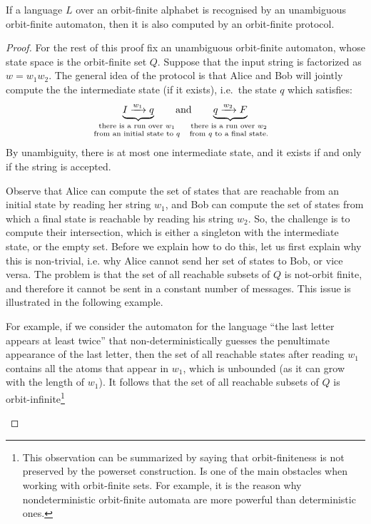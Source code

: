 \begin{theorem}
    \label{thm:unambiguous-to-protocol}
    If a language $L$ over an orbit-finite alphabet is recognised by an unambiguous orbit-finite automaton, then it is also computed by an orbit-finite protocol.
\end{theorem}
\begin{proof}
For the rest of this proof fix an unambiguous orbit-finite automaton, whose state space is the orbit-finite set $Q$.
Suppose that the input string is factorized as $w = w_1 w_2$. The general idea of the protocol is that Alice and Bob will jointly
compute the the intermediate state (if it exists), i.e.~the state $q$ which satisfies:
\begin{align*}
\myunderbrace{I \xrightarrow{w_1}q}{there is a run over $w_1$\\ from an initial state to $q$} \qquad \text{and} \qquad
\myunderbrace{q \xrightarrow{w_2} F}{there is a run over $w_2$\\ from $q$ to a final state.}
\end{align*}
By unambiguity, there is at most one intermediate state, and it exists if and only if the string is accepted.

Observe that Alice can compute
the set of states that are reachable from an initial state by reading her string $w_1$, and Bob can compute the set of states from which a final state is reachable by reading his string $w_2$. 
So, the challenge is to compute their intersection, which is either a singleton with the intermediate state, or the empty set. Before we explain how to do this,
let us first explain why this is non-trivial, i.e. why Alice cannot send her set of states to Bob, or vice versa. The problem is that the set of all reachable subsets of $Q$ is not-orbit finite, and therefore it cannot be sent in a constant number of messages. This issue is illustrated in the following example.

\begin{myexample}
    For example, if we consider the automaton for the language ``the last letter appears at least twice'' that non-deterministically guesses the penultimate appearance of the last letter, 
then the set of all reachable states after reading $w_1$ contains all the atoms that appear in $w_1$, which is unbounded (as it can grow with the length of $w_1$).
 It follows
that the set of all reachable subsets of $Q$ is orbit-infinite\footnote{
This observation can be summarized by saying that orbit-finiteness
is not preserved by the powerset construction. Is one of the main obstacles when working with orbit-finite sets. For example, it is the reason why nondeterministic orbit-finite automata are more powerful than deterministic ones.}
\end{myexample}


\end{proof}
